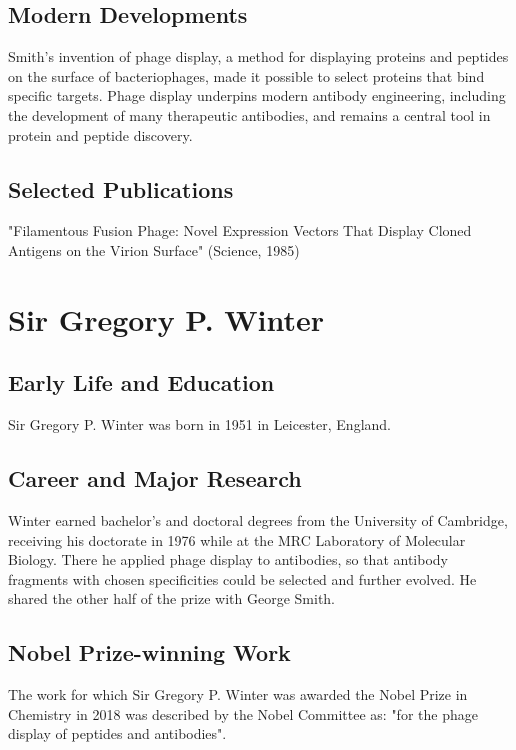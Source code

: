 \subsection*{Modern Developments}

Smith's invention of phage display, a method for displaying proteins and peptides on the surface of bacteriophages, made it possible to select proteins that bind specific targets. Phage display underpins modern antibody engineering, including the development of many therapeutic antibodies, and remains a central tool in protein and peptide discovery.

\subsection*{Selected Publications}

"Filamentous Fusion Phage: Novel Expression Vectors That Display Cloned Antigens on the Virion Surface" (Science, 1985)

\clearpage

\section{Sir Gregory P. Winter}

\subsection*{Early Life and Education}

Sir Gregory P. Winter was born in 1951 in Leicester, England.

\subsection*{Career and Major Research}

Winter earned bachelor's and doctoral degrees from the University of Cambridge, receiving his doctorate in 1976 while at the MRC Laboratory of Molecular Biology. There he applied phage display to antibodies, so that antibody fragments with chosen specificities could be selected and further evolved. He shared the other half of the prize with George Smith.

\subsection*{Nobel Prize-winning Work}

The work for which Sir Gregory P. Winter was awarded the Nobel Prize in Chemistry in 2018 was described by the Nobel Committee as: "for the phage display of peptides and antibodies".

